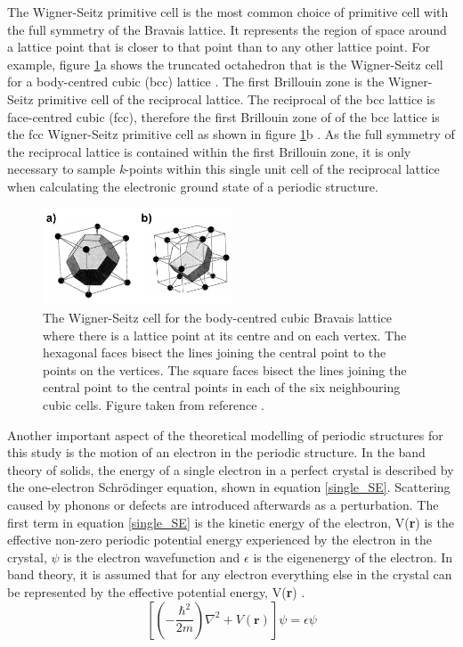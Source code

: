 The Wigner-Seitz primitive cell is the most common choice of primitive cell with the full symmetry of the Bravais lattice. It represents the region of space around a lattice point  that is closer to that point than to any other lattice point. For example, figure \ref{Wigner-Seitz}a shows the truncated octahedron that is the Wigner-Seitz cell for a body-centred cubic (bcc) lattice \cite{AshcroftMermin2}.
The first Brillouin zone is the Wigner-Seitz primitive cell of the reciprocal lattice. The reciprocal of the bcc lattice is face-centred cubic (fcc), therefore the first Brillouin zone of  of the bcc lattice is the fcc Wigner-Seitz primitive cell as shown in figure \ref{Wigner-Seitz}b \cite{AshcroftMermin3}. As the full symmetry of the reciprocal lattice is contained within the first Brillouin zone, it is only necessary to sample \textit{k}-points within this single unit cell of the reciprocal lattice when calculating the electronic ground state of a periodic structure.
\begin{figure}[h!]
  \centering
    \includegraphics[width=0.5\textwidth]{figures/Wigner-Seitz.png}
    \caption{The Wigner-Seitz cell for the body-centred cubic Bravais lattice where there is a lattice point at its centre and on each vertex. The hexagonal faces bisect the lines joining the central point to the points on the vertices. The square faces bisect the lines joining the central point to the central points in each of the six neighbouring cubic cells. Figure taken from reference .}
  \label{Wigner-Seitz}
\end{figure}
 
Another important aspect of the theoretical modelling of periodic structures for this 
study is the motion of an electron in the periodic structure. In the band theory of 
solids, the energy of a single electron in a perfect crystal is described by the one-electron 
Schr{\"o}dinger equation, shown in equation \ref{single_SE}. Scattering caused by phonons or defects are introduced afterwards as a perturbation. The first term in equation \ref{single_SE} is the kinetic 
energy of the electron, V(\textbf{r}) is the effective non-zero periodic potential energy experienced by 
the electron in the crystal, $\psi$ is the electron wavefunction and  $\epsilon$ is the 
eigenenergy of the electron. In band theory, it is assumed that for any electron everything else in the crystal can be represented by the effective potential energy, V(\textbf{r}) \cite{Blakemore2}.
\begin{equation} \label{single_SE}
\left[ \left(-\frac{\hbar^2}{2m}\right)\nabla^2 + V(\mathbf{r})\right]\psi = \epsilon \psi 
\end{equation}

